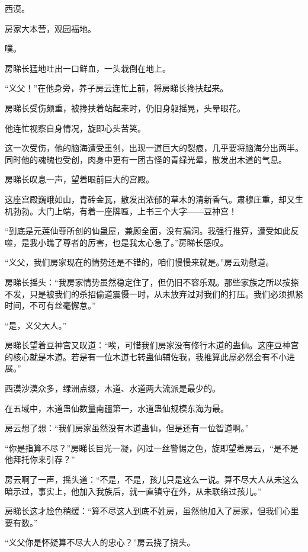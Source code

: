 
\begin{this_body}

西漠。

房家大本营，观园福地。

噗。

房睇长猛地吐出一口鲜血，一头栽倒在地上。

“义父！”在他身旁，养子房云连忙上前，将房睇长搀扶起来。

房睇长受伤颇重，被搀扶着站起来时，仍旧身躯摇晃，头晕眼花。

他连忙视察自身情况，旋即心头苦笑。

这一次受伤，他的脑海遭受重创，出现一道巨大的裂痕，几乎要将脑海分出两半。同时他的魂魄也受创，肉身中更有一团古怪的青绿光晕，散发出木道的气息。

房睇长叹息一声，望着眼前巨大的宫殿。

这座宫殿巍峨如山，青砖金瓦，散发出浓郁的草木的清新香气。肃穆庄重，却又生机勃勃。大门上端，有着一座牌匾，上书三个大字——豆神宫！

“到底是元莲仙尊所创的仙蛊屋，兼顾全面，没有漏洞。我强行推算，遭受如此反噬，是我小瞧了尊者的厉害，也是我太心急了。”房睇长感叹。

“义父，我们房家现在的情势还是不错的，咱们慢慢来就是。”房云劝慰道。

房睇长摇头：“我房家情势虽然稳定住了，但仍旧不容乐观。那些家族之所以按捺不发，只是被我们的杀招偷道震慑一时，从未放弃过对我们的打压。我们必须抓紧时间，不可有丝毫懈怠。”

“是，义父大人。”

房睇长望着豆神宫又叹道：“唉，可惜我们房家没有修行木道的蛊仙。这座豆神宫的核心就是木道。若是有一位木道七转蛊仙辅佐我，我推算此屋必然会有不小进展。”

西漠沙漠众多，绿洲点缀，木道、水道两大流派是最少的。

在五域中，木道蛊仙数量南疆第一，水道蛊仙规模东海为最。

房云想了想：“我们房家虽然没有木道蛊仙，但是还有一位智道啊。”

“你是指算不尽？”房睇长目光一凝，闪过一丝警惕之色，旋即望着房云，“是不是他拜托你来引荐？”

房云啊了一声，摇头道：“不是，不是，孩儿只是这么一说。算不尽大人从未这么暗示过，事实上，他加入我族后，就一直镇守在外，从未联络过孩儿。”

房睇长这才脸色稍缓：“算不尽这人到底不姓房，虽然他加入了房家，但我们心里要有数。”

“义父你是怀疑算不尽大人的忠心？”房云挠了挠头。


\end{this_body}
